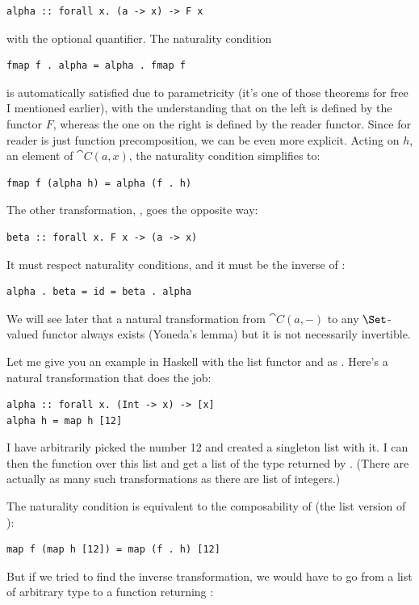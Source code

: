 \begin{Verbatim}
alpha :: forall x. (a -> x) -> F x
\end{Verbatim}
with the optional  quantifier. The naturality condition

\begin{Verbatim}
fmap f . alpha = alpha . fmap f
\end{Verbatim}
is automatically satisfied due to parametricity (it's one of those
theorems for free I mentioned earlier), with the understanding that
 on the left is defined by the functor $F$, whereas
the one on the right is defined by the reader functor. Since
 for reader is just function precomposition, we can be even
more explicit. Acting on $h$, an element of $\cat{C}(a, x)$,
the naturality condition simplifies to:

\begin{Verbatim}
fmap f (alpha h) = alpha (f . h)
\end{Verbatim}
The other transformation, , goes the opposite way:

\begin{Verbatim}
beta :: forall x. F x -> (a -> x)
\end{Verbatim}
It must respect naturality conditions, and it must be the inverse of :

\begin{Verbatim}
alpha . beta = id = beta . alpha
\end{Verbatim}
We will see later that a natural transformation from $\cat{C}(a, -)$
to any $\Set$-valued functor always exists (Yoneda's lemma) but it
is not necessarily invertible.

Let me give you an example in Haskell with the list functor and
 as . Here's a natural transformation that does
the job:

\begin{Verbatim}
alpha :: forall x. (Int -> x) -> [x]
alpha h = map h [12]
\end{Verbatim}
I have arbitrarily picked the number 12 and created a singleton list
with it. I can then  the function  over this list
and get a list of the type returned by . (There are actually
as many such transformations as there are list of integers.)

The naturality condition is equivalent to the composability of
 (the list version of ):

\begin{Verbatim}
map f (map h [12]) = map (f . h) [12]
\end{Verbatim}
But if we tried to find the inverse transformation, we would have to go
from a list of arbitrary type  to a function returning
:

